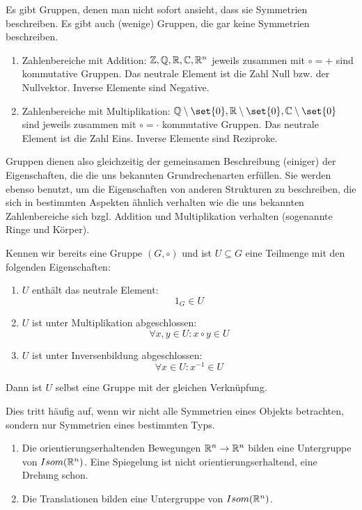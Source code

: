 \begin{example}
Es gibt Gruppen, denen man nicht sofort ansieht, dass sie Symmetrien beschreiben. Es gibt auch (wenige) Gruppen, die gar keine Symmetrien beschreiben.

\begin{enumerate}
\item Zahlenbereiche mit Addition: $\mathbb{Z},\mathbb{Q},\mathbb{R},\mathbb{C},\mathbb{R}^n$ jeweils zusammen mit $\circ=+$ sind kommutative Gruppen. Das neutrale Element ist die Zahl Null bzw. der Nullvektor. Inverse Elemente sind Negative.
\item Zahlenbereiche mit Multiplikation: $\IQ\setminus\set{0},\IR\setminus\set{0},\IC\setminus\set{0}$ sind jeweils zusammen mit $\circ=\cdot$ kommutative Gruppen. Das neutrale Element ist die Zahl Eins. Inverse Elemente sind Reziproke.
\end{enumerate}

Gruppen dienen also gleichzeitig der gemeinsamen Beschreibung (einiger) der Eigenschaften, die die uns bekannten Grundrechenarten erfüllen. Sie werden ebenso benutzt, um die Eigenschaften von anderen Strukturen zu beschreiben, die sich in bestimmten Aspekten ähnlich verhalten wie die uns bekannten Zahlenbereiche sich bzgl. Addition und Multiplikation verhalten (sogenannte Ringe und Körper).
\end{example}

\begin{example}[Untergruppen]
Kennen wir bereits eine Gruppe $(G,\circ)$ und ist $U\subseteq G$ eine Teilmenge mit den folgenden Eigenschaften:
\begin{enumerate}[label=(UG\arabic*)]
\item $U$ enthält das neutrale Element:
\[1_G\in U\]
\item $U$ ist unter Multiplikation abgeschlossen:
\[\forall x,y\in U: x\circ y\in U\]
\item $U$ ist unter Inversenbildung abgeschlossen:
\[\forall x\in U: x^{-1}\in U\]
\end{enumerate}
Dann ist $U$ selbst eine Gruppe mit der gleichen Verknüpfung.

Dies tritt häufig auf, wenn wir nicht alle Symmetrien eines Objekts betrachten, sondern nur Symmetrien eines bestimmten Typs.

\begin{enumerate}
\item Die orientierungserhaltenden Bewegungen $\mathbb{R}^n\to\mathbb{R}^n$ bilden eine Untergruppe von $Isom(\mathbb{R}^n)$. Eine Spiegelung ist nicht orientierungserhaltend, eine Drehung schon.
\item Die Translationen bilden eine Untergruppe von $Isom(\mathbb{R}^n)$.
\end{enumerate}
\end{example}

